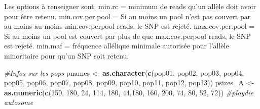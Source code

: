\documentclass[
  openany]{book}
\newenvironment{Shaded}{\begin{snugshade}}{\end{snugshade}}
\newcommand{\CommentTok}[1]{\textcolor[rgb]{0.56,0.35,0.01}{\textit{#1}}}
\newcommand{\FunctionTok}[1]{\textcolor[rgb]{0.13,0.29,0.53}{\textbf{#1}}}
\newcommand{\NormalTok}[1]{#1}
\newcommand{\OtherTok}[1]{\textcolor[rgb]{0.56,0.35,0.01}{#1}}
\newcommand{\StringTok}[1]{\textcolor[rgb]{0.31,0.60,0.02}{#1}}
\theoremstyle{definition}
\theoremstyle{definition}
\theoremstyle{definition}
\theoremstyle{definition}
\theoremstyle{remark}
\begin{document}
Les options à renseigner sont:
min.rc = minimum de reads qu'un allèle doit avoir pour être retenu.
min.cov.per.pool = Si au moins un pool n'est pas couvert par au moins au moins min.cov.perpool reads, le SNP est rejeté.
max.cov.per.pool = Si au moins un pool est couvert par plus de que max.cov.perpool reads, le SNP est rejeté.
min.maf = fréquence allélique minimale autorisée pour l'allèle minoritaire pour qu'un SNP soit retenu.

\begin{Shaded}
\begin{Highlighting}[]
\CommentTok{\#Infos sur les pops}
\NormalTok{pnames }\OtherTok{\textless{}{-}} \FunctionTok{as.character}\NormalTok{(}\FunctionTok{c}\NormalTok{(}\StringTok{\textquotesingle{}pop01\textquotesingle{}}\NormalTok{, }\StringTok{\textquotesingle{}pop02\textquotesingle{}}\NormalTok{, }\StringTok{\textquotesingle{}pop03\textquotesingle{}}\NormalTok{, }\StringTok{\textquotesingle{}pop04\textquotesingle{}}\NormalTok{, }\StringTok{\textquotesingle{}pop05\textquotesingle{}}\NormalTok{, }\StringTok{\textquotesingle{}pop06\textquotesingle{}}\NormalTok{, }\StringTok{\textquotesingle{}pop07\textquotesingle{}}\NormalTok{, }\StringTok{\textquotesingle{}pop08\textquotesingle{}}\NormalTok{, }\StringTok{\textquotesingle{}pop09\textquotesingle{}}\NormalTok{, }\StringTok{\textquotesingle{}pop10\textquotesingle{}}\NormalTok{, }\StringTok{\textquotesingle{}pop11\textquotesingle{}}\NormalTok{, }\StringTok{\textquotesingle{}pop12\textquotesingle{}}\NormalTok{, }\StringTok{\textquotesingle{}pop13\textquotesingle{}}\NormalTok{))}
\NormalTok{psizes\_A }\OtherTok{\textless{}{-}} \FunctionTok{as.numeric}\NormalTok{(}\FunctionTok{c}\NormalTok{(}\StringTok{\textquotesingle{}150\textquotesingle{}}\NormalTok{, }\StringTok{\textquotesingle{}180\textquotesingle{}}\NormalTok{, }\StringTok{\textquotesingle{}24\textquotesingle{}}\NormalTok{, }\StringTok{\textquotesingle{}114\textquotesingle{}}\NormalTok{, }\StringTok{\textquotesingle{}180\textquotesingle{}}\NormalTok{, }\StringTok{\textquotesingle{}44\textquotesingle{}}\NormalTok{,}\StringTok{\textquotesingle{}180\textquotesingle{}}\NormalTok{, }\StringTok{\textquotesingle{}160\textquotesingle{}}\NormalTok{, }\StringTok{\textquotesingle{}200\textquotesingle{}}\NormalTok{, }\StringTok{\textquotesingle{}74\textquotesingle{}}\NormalTok{, }\StringTok{\textquotesingle{}80\textquotesingle{}}\NormalTok{, }\StringTok{\textquotesingle{}52\textquotesingle{}}\NormalTok{, }\StringTok{\textquotesingle{}72\textquotesingle{}}\NormalTok{))   }\CommentTok{\#ploydie autosome}

\end{Highlighting}
\end{Shaded}
\end{document}
